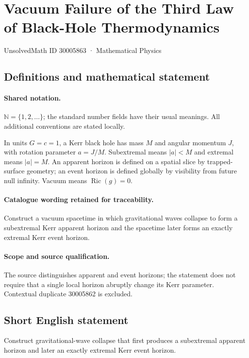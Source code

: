 \documentclass[11pt]{article}
\begin{document}
\setcounter{section}{30005862}
\section{Vacuum Failure of the Third Law of Black-Hole Thermodynamics}\label{30005863}
{\small UnsolvedMath ID 30005863 · Mathematical Physics}
\subsection{Definitions and mathematical statement}

\paragraph{Shared notation.}$\mathbb N=\{1,2,\ldots\}$; the standard number fields have their usual meanings. All additional conventions are stated locally.


In units $G=c=1$, a Kerr black hole has mass $M$ and angular momentum $J$, with rotation parameter $a=J/M$. Subextremal means $|a|<M$ and extremal means $|a|=M$. An apparent horizon is defined on a spatial slice by trapped-surface geometry; an event horizon is defined globally by visibility from future null infinity. Vacuum means $\operatorname{Ric}(g)=0$.

\paragraph{Catalogue wording retained for traceability.}
Construct a vacuum spacetime in which gravitational waves collapse to form a subextremal Kerr apparent horizon and the spacetime later forms an exactly extremal Kerr event horizon.

\paragraph{Scope and source qualification.}The source distinguishes apparent and event horizons; the statement does not require that a single local horizon abruptly change its Kerr parameter. Contextual duplicate 30005862 is excluded.
\subsection{Short English statement}
Construct gravitational-wave collapse that first produces a subextremal apparent horizon and later an exactly extremal Kerr event horizon.
\end{document}

